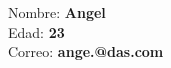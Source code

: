 \documentclass{article}
\begin{document}
Nombre: \textbf{Angel} \\
Edad: \textbf{23} \\
Correo: \textbf{ange.@das.com}
\end{document}
